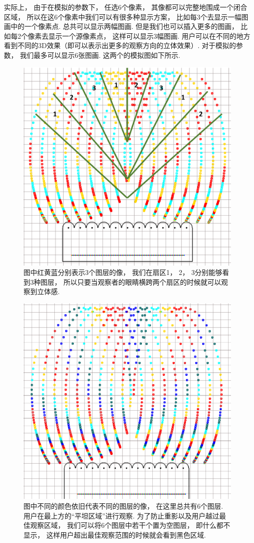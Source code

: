 \documentclass[12pt,a4paper]{article}
\begin{document}
实际上， 由于在模拟的参数下， 任选6个像素， 其像都可以完整地围成一个闭合区域， 所以在这6个像素中我们可以有很多种显示方案， 比如每3个去显示一幅图画中的一个像素点. 总共可以显示两幅图画. 但是我们也可以插入更多的图画， 比如每2个像素去显示一个源像素点， 这样可以显示3幅图画. 用户可以在不同的地方看到不同的3D效果（即可以表示出更多的观察方向的立体效果）. 对于模拟的参数， 我们最多可以显示6张图画. 这两个的模拟图如下所示.
\begin{figure}[h!]
    \centering\includegraphics[width=0.8\linewidth]{triple}
    \caption{图中红黄蓝分别表示3个图层的像， 我们在扇区1， 2， 3分别能够看到3种图层， 所以只要当观察者的眼睛横跨两个扇区的时候就可以观察到立体感.}
\end{figure}
\begin{figure}[h!]
    \centering\includegraphics[width=0.8\linewidth]{250}
    \caption{图中不同的颜色依旧代表不同的图层的像， 在这里总共有6个图层. 用户在最上方的“平坦区域”进行观察. 为了防止重影以及用户越过最佳观察区域， 我们可以将6个图层中若干个置为空图层， 即什么都不显示， 这样用户超出最佳观察范围的时候就会看到黑色区域.}
\end{figure}
\end{document}
